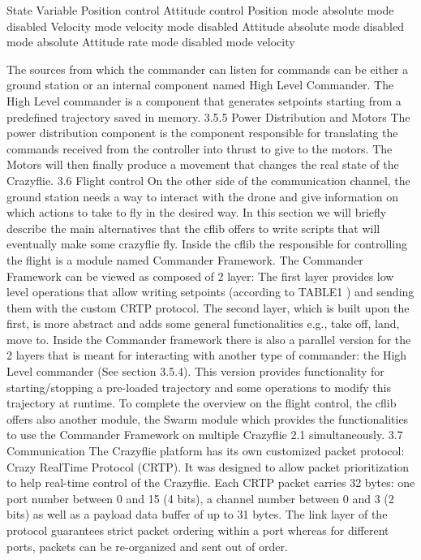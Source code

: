 State Variable
Position control
Attitude control
Position
mode absolute
mode disabled
Velocity
mode velocity
mode disabled
Attitude absolute
mode disabled
mode absolute
Attitude rate
mode disabled
mode velocity


The sources from which the commander can listen for commands can be either a ground station or an internal component named High Level Commander. The High Level commander is a component that generates setpoints starting from a predefined trajectory saved in memory.
3.5.5 Power Distribution and Motors
The power distribution component is the component responsible for translating the commands received from the controller into thrust to give to the motors. The Motors will then finally produce a movement that changes the real state of the Crazyflie.
3.6 Flight control
On the other side of the communication channel, the ground station needs a way to interact with the drone and give information on which actions to take to fly in the desired way.
In this section we will briefly describe the main alternatives that the cflib offers to write scripts that will eventually make some crazyflie fly.
Inside the cflib the responsible for controlling the flight is a module named Commander Framework.
The Commander Framework can be viewed as composed of 2 layer:
The first layer provides low level operations that allow writing setpoints (according to TABLE1 ) and sending them with the custom CRTP protocol.
The second layer, which is built upon the first, is more abstract and adds some general functionalities e.g., take off, land, move to.
Inside the Commander framework there is also a parallel version for the 2 layers that is meant for interacting with another type of commander: the High Level commander (See section 3.5.4). This version provides functionality for starting/stopping a pre-loaded trajectory and some operations to modify this trajectory at runtime.
To complete the overview on the flight control, the cflib offers also another module, the Swarm module which provides the functionalities to use the Commander Framework on multiple Crazyflie 2.1 simultaneously.
3.7 Communication
The Crazyflie platform has its own customized packet protocol: Crazy RealTime Protocol (CRTP). It was designed to allow packet prioritization to help real-time control of the Crazyflie.
Each CRTP packet carries 32 bytes: one port number between 0 and 15 (4 bits), a channel number between 0 and 3 (2 bits) as well as a payload data buffer of up to 31 bytes.
The link layer of the protocol guarantees strict packet ordering within a port whereas for different ports, packets can be re-organized and sent out of order. 

